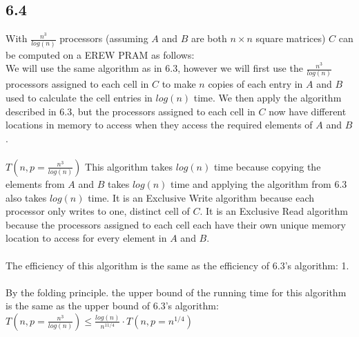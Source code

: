 \documentclass[letterpaper,notitlepage,twoside]{article}
\begin{document}
\subsection*{6.4}
With $\frac{n^{3}}{log(n)}$ processors (assuming $A$ and $B$ are both $n \times n$ square matrices) $C$ can be computed on a EREW PRAM as follows: \\
We will use the same algorithm as in 6.3, however we will first use the $\frac{n^{3}}{log(n)}$ processors assigned to each cell in $C$ to make $n$ copies of each entry in $A$ and $B$ used to calculate the cell entries in $log(n)$ time. We then apply the algorithm described in 6.3, but the processors assigned to each cell in $C$ now have different locations in memory to access when they access the required elements of $A$ and $B$. \\\\
$T(n, p = \frac{n^{3}}{log(n)})$ This algorithm takes $log(n)$ time because copying the elements from $A$ and $B$ takes $log(n)$ time and applying the algorithm from 6.3 also takes $log(n)$ time. It is an Exclusive Write algorithm because each processor only writes to one, distinct cell of $C$. It is an Exclusive Read algorithm because the processors assigned to each cell each have their own unique memory location to access for every element in $A$ and $B$. \\\\
The efficiency of this algorithm is the same as the efficiency of 6.3's algorithm: 1.\\\\
By the folding principle. the upper bound of the running time for this algorithm is the same as the upper bound of 6.3's algorithm: \\
$T(n, p = \frac{n^{3}}{log(n)}) \leq \frac{log(n)}{n^{11/4}} \cdot T(n, p = n^{1/4})$
\end{document}
